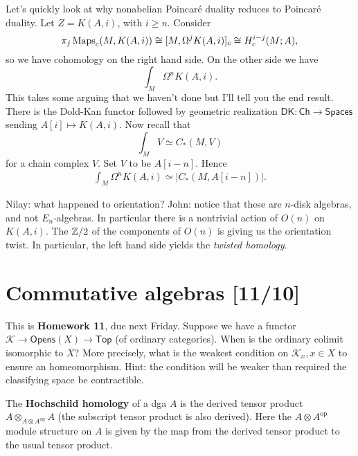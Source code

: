 \documentclass{amsart}
\begin{document}
\begin{remark}
    Let's quickly look at why nonabelian Poincar\'e duality reduces to Poincar\'e duality.
    Let $Z=K(A,i)$, with $i\geq n$. Consider
    \begin{equation*}
        \pi_j\operatorname{Maps}_c(M,K(A,i)) \cong [M, \Omega^jK(A,i)]_c \cong H^{i-j}_c(M;A),
    \end{equation*}
    so we have cohomology on the right hand side. On the other side we have
    \begin{equation*}
        \int_M \Omega^nK(A,i).
    \end{equation*}
    This takes some arguing that we haven't done but I'll tell you the end result.
    There is the Dold-Kan functor followed by geometric realization
    $\mathsf{DK}:\mathsf{Ch}\to\mathsf{Spaces}$ sending $A[i]\mapsto K(A,i)$. Now recall that
    \begin{equation*}
        \int_M V \simeq C_*(M,V)
    \end{equation*}
    for a chain complex $V$. Set $V$ to be $A[i-n]$. Hence
    \begin{align*}
        \int_M \Omega^n K(A,i) \simeq |C_*(M, A[i-n])|.
    \end{align*}

    Nilay: what happened to orientation?
    John: notice that these are $n$-disk algebras, and not $E_n$-algebras. In particular
    there is a nontrivial action of $O(n)$ on $K(A,i)$. The $\mathbb{Z}/2$ of the components of
    $O(n)$ is giving us the orientation twist. In particular, the left hand side yields
    the \textit{twisted homology}.
\end{remark}

\newpage

\section{Commutative algebras [11/10]}

\begin{exercise}
    This is \textbf{Homework 11}, due next Friday.
    Suppose we have a functor $\mathcal{K}\to \mathsf{Opens}(X)\to\mathsf{Top}$
    (of ordinary categories). When is the ordinary colimit isomorphic to $X$? More precisely, what is the weakest
    condition on $\mathcal{K}_x, x\in X$ to ensure an homeomorphism. Hint: the condition will be weaker
    than required the classifying space be contractible.
\end{exercise}

\begin{definition}
    The \textbf{Hochschild homology} of a dga $A$ is the derived tensor product
    $A\otimes_{A\otimes A^\text{op}} A$ (the subscript tensor product is also derived).
    Here the $A\otimes A^\text{op}$ module structure on $A$ is given by the map
    from the derived tensor product to the usual tensor product.
\end{definition}
\end{document}
